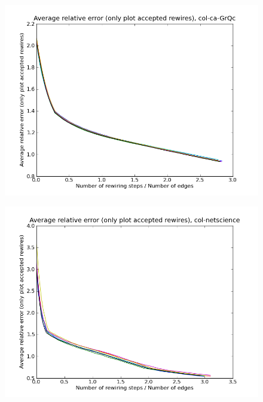 \documentclass[12pt]{article}
\begin{document}
\begin{figure}[p]
\includegraphics[scale=0.75]{acceptedOnly-col-ca-GrQc.png}\\
\end{figure}


\begin{figure}[p]
\includegraphics[scale=0.75]{acceptedOnly-col-netscience.png}\\
\end{figure}
\end{document}

